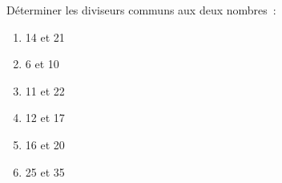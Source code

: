 \documentclass[exercice]{thedocument}%
\begin{document}
%
Déterminer les diviseurs communs aux deux nombres~:
\begin{enumerate}
    \item 14 et  21
    \item 6 et 10
    \item 11 et 22
    \item 12 et 17
    \item 16 et 20
    \item 25 et 35
\end{enumerate}
\end{document}
